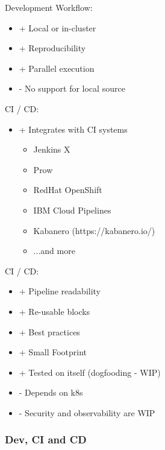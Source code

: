 \documentclass[aspectratio=169,11pt,hyperref={colorlinks=true}]{beamer}
\begin{document}
\begin{lblackrwhiteframe}
\begin{lblackrwhiteframe}
\begin{blackframe}
\begin{whiteframe}
\begin{2columnsframe}
  {
    Development Workflow:
    \begin{itemize}
      \item + Local or in-cluster
      \item + Reproducibility
      \item + Parallel execution
      \item - No support for local source
    \end{itemize}
    CI / CD:
    \begin{itemize}
      \item + Integrates with CI systems
      \begin{itemize}
        \item Jenkins X
        \item Prow
        \item RedHat OpenShift
        \item IBM Cloud Pipelines
        \item Kabanero (https://kabanero.io/)
        \item ...and more
      \end{itemize}
    \end{itemize}
  }
  {
    CI / CD:
    \begin{itemize}
      \item + Pipeline readability
      \item + Re-usable blocks
      \item + Best practices
      \item + Small Footprint
      \item + Tested on itself (dogfooding - WIP)
      \item - Depends on k8s
      \item - Security and observability are WIP
    \end{itemize}
  }
  \frametitle{Dev, CI and CD}
\end{2columnsframe}


\end{whiteframe}
\end{blackframe}
\end{lblackrwhiteframe}
\end{lblackrwhiteframe}
\end{document}
